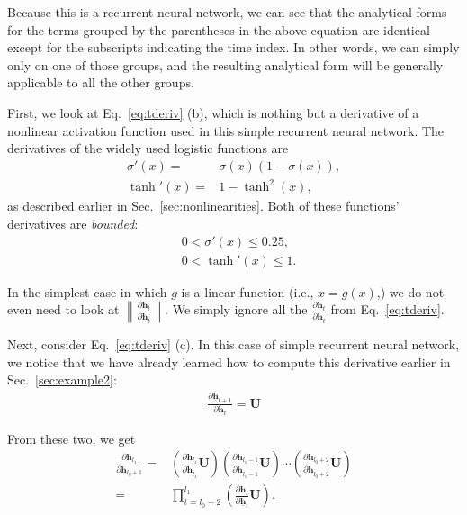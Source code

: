 \documentclass{report}
\newcommand{\vect}[1]{\mathbf{#1}}
\newcommand{\matr}[1]{\mathbf{#1}}
\newcommand{\vh}[0]{\vect{h}}
\newcommand{\mU}[0]{\matr{U}}
\begin{document}
Because this is a recurrent neural network, we can see that the analytical forms
for the terms grouped by the parentheses in the above equation are identical
except for the subscripts indicating the time index. In other words, we can
simply only on one of those groups, and the resulting analytical form will be
generally applicable to all the other groups.

First, we look at Eq.~\eqref{eq:tderiv} (b), which is nothing but a derivative
of a nonlinear activation function used in this simple recurrent neural network.
The derivatives of the widely used logistic functions are 
\begin{align*}
    \sigma'(x) =& \sigma(x) (1 - \sigma(x)), \\
    \tanh'(x) =& 1 - \tanh^2(x),
\end{align*}
as described earlier in Sec.~\ref{sec:nonlinearities}. 
Both of these functions' derivatives are {\em bounded}:
\begin{align}
    \label{eq:sigmoid_bound}
    &0 < \sigma'(x) \leq 0.25, \\
    \label{eq:tanh_bound}
    &0 < \tanh'(x) \leq 1.
\end{align}

In the simplest case in which $g$ is a linear function (i.e., $x=g(x)$,) we do
not even need to look at $\left\| \frac{\partial \vh_{t}}{\partial
\underline{\vh}_{t}} \right\|$. We simply ignore all the $\frac{\partial
\vh_t}{\partial \underline{\vh}_t}$ from Eq.~\eqref{eq:tderiv}.

Next, consider Eq.~\eqref{eq:tderiv} (c). In this case of simple recurrent
neural network, we notice that we have already learned how to compute this
derivative earlier in Sec.~\ref{sec:example2}:
\begin{align*}
    \frac{\partial \underline{\vh}_{t+1}}{\partial \vh_{t}} = \mU
\end{align*}

From these two, we get
\begin{align*}
    \frac{\partial \vh_{l_1}}{\partial \vh_{l_0+1}} =&
    \left(
    \frac{\partial \vh_{l_1}}{\partial \underline{\vh}_{l_1}}
    \mU
\right)
\left(
    \frac{\partial \vh_{l_1-1}}{\partial \underline{\vh}_{l_1-1}}
    \mU
\right)
    \cdots
\left(
    \frac{\partial \vh_{l_0+2}}{\partial \underline{\vh}_{l_0+2}}
    \mU
    \right) 
    \\
    =& \prod_{t=l_0+2}^{l_1} \left( \frac{\partial \vh_{t}}{\partial
\underline{\vh}_{t}} \mU\right).
\end{align*}
\end{document}
